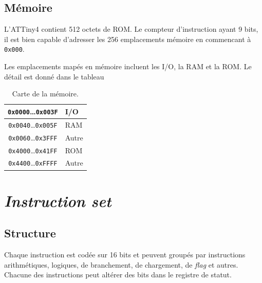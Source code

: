 \documentclass[11pt]{article}
\begin{document}
\subsection{Mémoire}\label{sec:memoire}
L'ATTiny4 contient 512 octets de ROM. Le compteur d'instruction
ayant 9 bits, il est bien capable d'adresser les 256
emplacements mémoire en commencant à \texttt{0x000}. 

Les emplacements mapés en mémoire incluent les I/O, la RAM et la
ROM. Le détail est donné dans le tableau
\begin{table}[htbp]
  \centering
  \begin{tabular}{|c|l|}
\hline
    \texttt{0x0000}…\texttt{0x003F} & I/O \\
\hline
    \texttt{0x0040}…\texttt{0x005F} & RAM \\
\hline
    \texttt{0x0060}…\texttt{0x3FFF} & Autre \\
\hline
    \texttt{0x4000}…\texttt{0x41FF} & ROM \\
\hline
    \texttt{0x4400}…\texttt{0xFFFF} & Autre \\
\hline
  \end{tabular}
  \caption{Carte de la mémoire.}
  \label{tab:memory-map}
\end{table}

\section{\emph{Instruction set}}
\subsection{Structure}
Chaque instruction est codée sur 16 bits et peuvent groupés par
instructions arithmétiques, logiques, de branchement, de chargement,
de \emph{flag} et autres. Chacune des instructions peut altérer des
bits dans le registre de statut.
\end{document}
